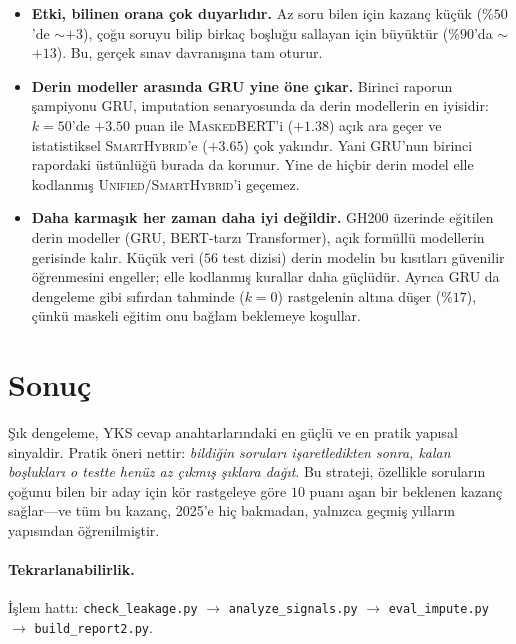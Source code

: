 \documentclass[11pt]{article}
\begin{document}
\begin{itemize}
  aralığında \textsc{SmartHybrid} (dengeleme + pencere-kaçınma) lider
  ($+3.66$ / $+6.33$); $\%85$--$\%90$'da saf \textsc{Hybrid}/\textsc{Unified}
  öne geçer ($+10$ ila $+13$). Çoğu gerçek aday $\%50$--$\%80$ aralığında
  olduğundan, pratikte \textsc{SmartHybrid} en faydalı modeldir.
  \item \textbf{Etki, bilinen orana çok duyarlıdır.} Az soru bilen için kazanç
  küçük ($\%50$'de $\sim$$+3$), çoğu soruyu bilip birkaç boşluğu sallayan için
  büyüktür ($\%90$'da $\sim$$+13$). Bu, gerçek sınav davranışına tam oturur.
  \item \textbf{Derin modeller arasında GRU yine öne çıkar.} Birinci raporun
  şampiyonu GRU, imputation senaryosunda da derin modellerin en iyisidir:
  $k=50$'de $+3.50$ puan ile \textsc{MaskedBERT}'i ($+1.38$) açık ara geçer ve
  istatistiksel \textsc{SmartHybrid}'e ($+3.65$) çok yakındır. Yani GRU'nun
  birinci rapordaki üstünlüğü burada da korunur. Yine de hiçbir derin model
  elle kodlanmış \textsc{Unified}/\textsc{SmartHybrid}'i geçemez.
  \item \textbf{Daha karmaşık her zaman daha iyi değildir.} GH200 üzerinde
  eğitilen derin modeller (GRU, BERT-tarzı Transformer), açık formüllü
  modellerin gerisinde kalır. Küçük veri ($56$ test dizisi) derin modelin bu
  kısıtları güvenilir öğrenmesini engeller; elle kodlanmış kurallar daha
  güçlüdür. Ayrıca GRU da dengeleme gibi sıfırdan tahminde ($k=0$) rastgelenin
  altına düşer ($\%17$), çünkü maskeli eğitim onu bağlam beklemeye koşullar.
\end{itemize}

\section{Sonuç}
Şık dengeleme, YKS cevap anahtarlarındaki en güçlü ve en pratik yapısal
sinyaldir. Pratik öneri nettir: \emph{bildiğin soruları işaretledikten
sonra, kalan boşlukları o testte henüz az çıkmış şıklara dağıt}. Bu strateji,
özellikle soruların çoğunu bilen bir aday için kör rastgeleye göre $10$
puanı aşan bir beklenen kazanç sağlar---ve tüm bu kazanç, 2025'e hiç
bakmadan, yalnızca geçmiş yılların yapısından öğrenilmiştir.

\paragraph{Tekrarlanabilirlik.} İşlem hattı: \texttt{check\_leakage.py}
$\rightarrow$ \texttt{analyze\_signals.py} $\rightarrow$
\texttt{eval\_impute.py} $\rightarrow$ \texttt{build\_report2.py}.
\end{document}
